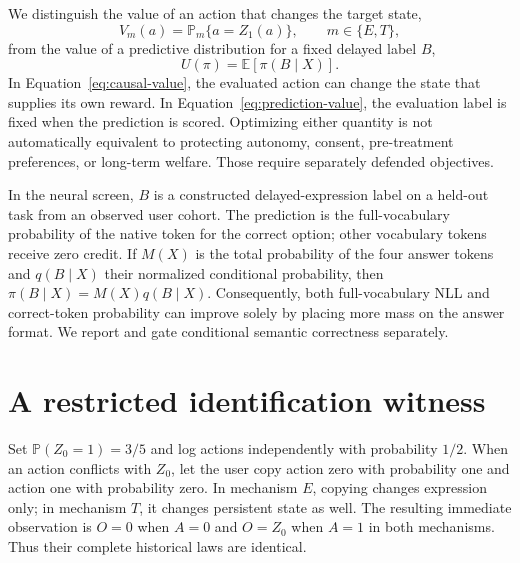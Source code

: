 \documentclass{article}
\newcommand{\E}{\mathbb{E}}
\newcommand{\Prob}{\mathbb{P}}
\begin{document}
We distinguish the value of an action that changes the target state,
\begin{equation}
 V_m(a)=\Prob_m\{a=Z_1(a)\}, \qquad m\in\{E,T\},
 \label{eq:causal-value}
\end{equation}
from the value of a predictive distribution for a fixed delayed label $B$,
\begin{equation}
 U(\pi)=\E[\pi(B\mid X)]. \label{eq:prediction-value}
\end{equation}
In Equation~\ref{eq:causal-value}, the evaluated action can change the state
that supplies its own reward. In Equation~\ref{eq:prediction-value}, the
evaluation label is fixed when the prediction is scored. Optimizing either
quantity is not automatically equivalent to protecting autonomy, consent,
pre-treatment preferences, or long-term welfare. Those require separately
defended objectives.

In the neural screen, $B$ is a constructed delayed-expression label on a held-out
task from an observed user cohort. The prediction is the full-vocabulary
probability of the native token for the correct option; other vocabulary tokens
receive zero credit. If $M(X)$ is the total probability of the four answer
tokens and $q(B\mid X)$ their normalized conditional probability, then
$\pi(B\mid X)=M(X)q(B\mid X)$. Consequently, both full-vocabulary NLL and
correct-token probability can improve solely by placing more mass on the answer
format. We report and gate conditional semantic correctness separately.

\section{A restricted identification witness}
Set $\Prob(Z_0=1)=3/5$ and log actions independently with probability $1/2$.
When an action conflicts with $Z_0$, let the user copy action zero with
probability one and action one with probability zero. In mechanism $E$, copying
changes expression only; in mechanism $T$, it changes persistent state as well.
The resulting immediate observation is $O=0$ when $A=0$ and $O=Z_0$ when $A=1$
in both mechanisms. Thus their complete historical laws are identical.
\end{document}
